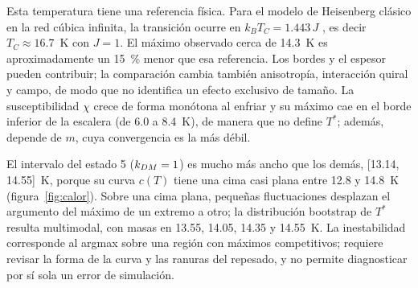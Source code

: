 Esta temperatura tiene una referencia física. Para el modelo de Heisenberg clásico en la red cúbica infinita, la transición ocurre en $k_BT_C=1.443\,J$ \citep{chen1993}, es decir $T_C\approx16.7$~K con $J=1$. El máximo observado cerca de 14.3~K es aproximadamente un 15~\% menor que esa referencia. Los bordes y el espesor pueden contribuir; la comparación cambia también anisotropía, interacción quiral y campo, de modo que no identifica un efecto exclusivo de tamaño. La susceptibilidad $\chi$ crece de forma monótona al enfriar y su máximo cae en el borde inferior de la escalera (de 6.0 a 8.4~K), de manera que no define $T^*$; además, depende de $m$, cuya convergencia es la más débil.

El intervalo del estado 5 ($k_{DM}=1$) es mucho más ancho que los demás, [13.14, 14.55]~K, porque su curva $c(T)$ tiene una cima casi plana entre 12.8 y 14.8~K (figura~\ref{fig:calor}). Sobre una cima plana, pequeñas fluctuaciones desplazan el argumento del máximo de un extremo a otro; la distribución bootstrap de $T^*$ resulta multimodal, con masas en 13.55, 14.05, 14.35 y 14.55~K. La inestabilidad corresponde al argmax sobre una región con máximos competitivos; requiere revisar la forma de la curva y las ranuras del repesado, y no permite diagnosticar por sí sola un error de simulación.
